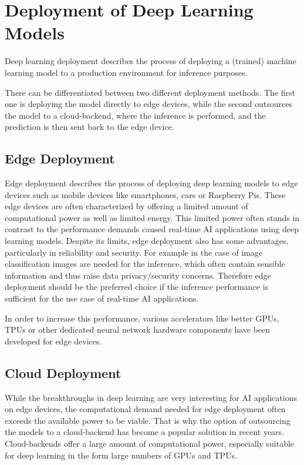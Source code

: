 \section{Deployment of Deep Learning Models}
Deep learning deployment describes the process of deploying a (trained) machine learning model to a production environment for inference purposes. 

There can be differentiated between two different deployment methods. The first one is deploying the model directly to edge devices, while the second outsources the model to a cloud-backend, where the inference is performed, and the prediction is then sent back to the edge device.
\subsection{Edge Deployment}
Edge deployment describes the process of deploying deep learning models to edge devices such as mobile devices like smartphones, cars or Raspberry Pis.
These edge devices are often characterized by offering a limited amount of computational power as well as limited energy.
This limited power often stands in contrast to the performance demands caused real-time AI applications using deep learning models.
Despite its limits, edge deployment also has some advantages, particularly in reliability and security. 
For example in the case of image classification images are needed for the inference, which often contain sensible information and thus raise data privacy/security concerns.
Therefore edge deployment should be the preferred choice if the inference performance is sufficient for the use case of real-time AI applications.

In order to increase this performance, various accelerators like better GPUs, TPUs or other dedicated neural network hardware components have been developed for edge devices.



\subsection{Cloud Deployment}
While the breakthroughs in deep learning are very interesting for AI applications on edge devices, the computational demand needed for edge deployment often exceeds the available power to be viable.
That is why the option of outsourcing the models to a cloud-backend has become a popular solution in recent years.
Cloud-backends offer a large amount of computational power, especially suitable for deep learning in the form large numbers of GPUs and TPUs.


